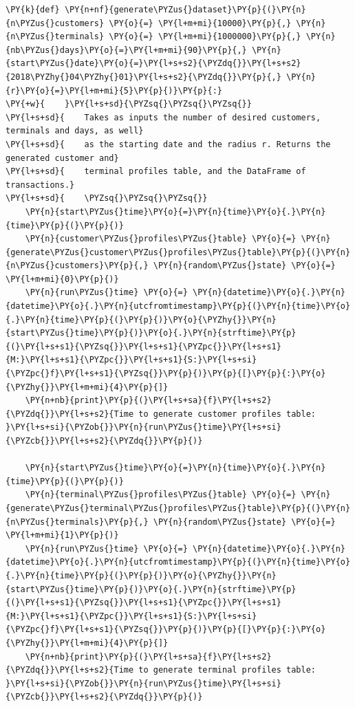     \begin{tcolorbox}[breakable, size=fbox, boxrule=1pt, pad at break*=1mm,colback=cellbackground, colframe=cellborder]
\begin{Verbatim}[commandchars=\\\{\}]
\PY{k}{def} \PY{n+nf}{generate\PYZus{}dataset}\PY{p}{(}\PY{n}{n\PYZus{}customers} \PY{o}{=} \PY{l+m+mi}{10000}\PY{p}{,} \PY{n}{n\PYZus{}terminals} \PY{o}{=} \PY{l+m+mi}{1000000}\PY{p}{,} \PY{n}{nb\PYZus{}days}\PY{o}{=}\PY{l+m+mi}{90}\PY{p}{,} \PY{n}{start\PYZus{}date}\PY{o}{=}\PY{l+s+s2}{\PYZdq{}}\PY{l+s+s2}{2018\PYZhy{}04\PYZhy{}01}\PY{l+s+s2}{\PYZdq{}}\PY{p}{,} \PY{n}{r}\PY{o}{=}\PY{l+m+mi}{5}\PY{p}{)}\PY{p}{:}
\PY{+w}{    }\PY{l+s+sd}{\PYZsq{}\PYZsq{}\PYZsq{}}
\PY{l+s+sd}{    Takes as inputs the number of desired customers, terminals and days, as well}
\PY{l+s+sd}{    as the starting date and the radius r. Returns the generated customer and}
\PY{l+s+sd}{    terminal profiles table, and the DataFrame of transactions.}
\PY{l+s+sd}{    \PYZsq{}\PYZsq{}\PYZsq{}}
    \PY{n}{start\PYZus{}time}\PY{o}{=}\PY{n}{time}\PY{o}{.}\PY{n}{time}\PY{p}{(}\PY{p}{)}
    \PY{n}{customer\PYZus{}profiles\PYZus{}table} \PY{o}{=} \PY{n}{generate\PYZus{}customer\PYZus{}profiles\PYZus{}table}\PY{p}{(}\PY{n}{n\PYZus{}customers}\PY{p}{,} \PY{n}{random\PYZus{}state} \PY{o}{=} \PY{l+m+mi}{0}\PY{p}{)}
    \PY{n}{run\PYZus{}time} \PY{o}{=} \PY{n}{datetime}\PY{o}{.}\PY{n}{datetime}\PY{o}{.}\PY{n}{utcfromtimestamp}\PY{p}{(}\PY{n}{time}\PY{o}{.}\PY{n}{time}\PY{p}{(}\PY{p}{)}\PY{o}{\PYZhy{}}\PY{n}{start\PYZus{}time}\PY{p}{)}\PY{o}{.}\PY{n}{strftime}\PY{p}{(}\PY{l+s+s1}{\PYZsq{}}\PY{l+s+s1}{\PYZpc{}}\PY{l+s+s1}{M:}\PY{l+s+s1}{\PYZpc{}}\PY{l+s+s1}{S:}\PY{l+s+si}{\PYZpc{}f}\PY{l+s+s1}{\PYZsq{}}\PY{p}{)}\PY{p}{[}\PY{p}{:}\PY{o}{\PYZhy{}}\PY{l+m+mi}{4}\PY{p}{]}
    \PY{n+nb}{print}\PY{p}{(}\PY{l+s+sa}{f}\PY{l+s+s2}{\PYZdq{}}\PY{l+s+s2}{Time to generate customer profiles table: }\PY{l+s+si}{\PYZob{}}\PY{n}{run\PYZus{}time}\PY{l+s+si}{\PYZcb{}}\PY{l+s+s2}{\PYZdq{}}\PY{p}{)}

    \PY{n}{start\PYZus{}time}\PY{o}{=}\PY{n}{time}\PY{o}{.}\PY{n}{time}\PY{p}{(}\PY{p}{)}
    \PY{n}{terminal\PYZus{}profiles\PYZus{}table} \PY{o}{=} \PY{n}{generate\PYZus{}terminal\PYZus{}profiles\PYZus{}table}\PY{p}{(}\PY{n}{n\PYZus{}terminals}\PY{p}{,} \PY{n}{random\PYZus{}state} \PY{o}{=} \PY{l+m+mi}{1}\PY{p}{)}
    \PY{n}{run\PYZus{}time} \PY{o}{=} \PY{n}{datetime}\PY{o}{.}\PY{n}{datetime}\PY{o}{.}\PY{n}{utcfromtimestamp}\PY{p}{(}\PY{n}{time}\PY{o}{.}\PY{n}{time}\PY{p}{(}\PY{p}{)}\PY{o}{\PYZhy{}}\PY{n}{start\PYZus{}time}\PY{p}{)}\PY{o}{.}\PY{n}{strftime}\PY{p}{(}\PY{l+s+s1}{\PYZsq{}}\PY{l+s+s1}{\PYZpc{}}\PY{l+s+s1}{M:}\PY{l+s+s1}{\PYZpc{}}\PY{l+s+s1}{S:}\PY{l+s+si}{\PYZpc{}f}\PY{l+s+s1}{\PYZsq{}}\PY{p}{)}\PY{p}{[}\PY{p}{:}\PY{o}{\PYZhy{}}\PY{l+m+mi}{4}\PY{p}{]}
    \PY{n+nb}{print}\PY{p}{(}\PY{l+s+sa}{f}\PY{l+s+s2}{\PYZdq{}}\PY{l+s+s2}{Time to generate terminal profiles table: }\PY{l+s+si}{\PYZob{}}\PY{n}{run\PYZus{}time}\PY{l+s+si}{\PYZcb{}}\PY{l+s+s2}{\PYZdq{}}\PY{p}{)}


\end{Verbatim}
\end{tcolorbox}
